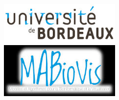 \documentclass[a4paper]{report}
\begin{document}
\begin{figure}[htbp]
\begin{minipage}[c]{.45\linewidth}
\begin{flushright}
\includegraphics[width=6cm]{Bordeaux.png}\end{flushright}
\end{minipage}
\hfill
\begin{minipage}[c]{.45\linewidth}
\begin{flushleft}
\includegraphics[width=6cm]{MaBioVis.jpg}
\end{flushleft}
\end{minipage}
\end{figure}
\end{document}
